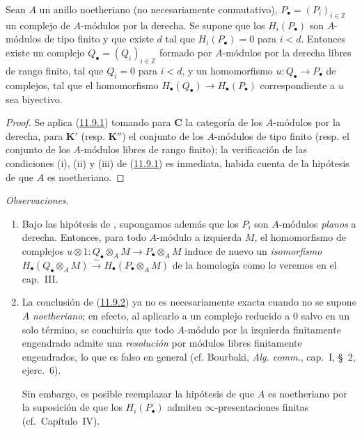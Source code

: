 \begin{corollary}[11.9.2]
\label{0.11.9.2-fr}
Sean $A$ un anillo noetheriano (no necesariamente conmutativo), $P_\bullet=(P_i)_{i\in\mathbb Z}$ un complejo de $A$-módulos por la derecha. Se supone que los $H_i(P_\bullet)$ son $A$-módulos de tipo finito y que existe $d$ tal que $H_i(P_\bullet)=0$ para $i<d$. Entonces existe un complejo $Q_\bullet=(Q_i)_{i\in\mathbb Z}$ formado por $A$-módulos por la derecha libres de rango finito, tal que $Q_i=0$ para $i<d$, y un homomorfismo $u:Q_\bullet\to P_\bullet$ de complejos, tal que el homomorfismo $H_\bullet(Q_\bullet)\to H_\bullet(P_\bullet)$ correspondiente a $u$ sea biyectivo.
\end{corollary}

\begin{proof}
Se aplica (\hyperref[0.11.9.1-fr]{11.9.1}) tomando para $\boldsymbol{C}$ la categoría de los $A$-módulos por la derecha, para $\boldsymbol{K}'$ (resp. $\boldsymbol{K}''$) el conjunto de los $A$-módulos de tipo finito (resp. el conjunto de los $A$-módulos libres de rango finito); la verificación de las condiciones (i), (ii) y (iii) de (\hyperref[0.11.9.1-fr]{11.9.1}) es inmediata, habida cuenta de la hipótesis de que $A$ es noetheriano.
\end{proof}

\begin{env}[11.9.3]
\label{0.11.9.3}
\label{0.11.9.3-fr}
\emph{Observaciones}.
\begin{enumerate}
  \item[{\rm(i)}]
  Bajo las hipótesis de , supongamos además que los
  $P_i$ son $A$-módulos \emph{planos} a derecha.
  Entonces, para todo $A$-módulo a izquierda $M$, el homomorfismo de complejos
  $u\otimes 1:Q_\bullet\otimes_A M\to P_\bullet\otimes_A M$
  induce de nuevo un \emph{isomorfismo}
  $H_\bullet(Q_\bullet\otimes_A M)\xrightarrow{\sim}
H_\bullet(P_\bullet\otimes_A M)$ de la homología como lo veremos en el cap.~III.
\item[{\rm(ii)}] La conclusión de (\hyperref[0.11.9.2-fr]{11.9.2}) ya no es necesariamente exacta cuando no se supone $A$ \emph{noetheriano}; en efecto, al aplicarlo a un complejo reducido a $0$ salvo en un solo término, se concluiría que todo $A$-módulo por la izquierda finitamente engendrado admite una \emph{resolución} por
  módulos libres finitamente engendrados, lo que es falso en general
(cf. Bourbaki, \emph{Alg. comm.}, cap.~I, \S~2, ejerc.~6).

  Sin embargo, es posible reemplazar la hipótesis de que $A$ es
  noetheriano por la suposición de que los $H_i(P_\bullet)$ admiten
  $\infty$-presentaciones finitas (cf.\ Capítulo~IV).
\end{enumerate}
\end{env}

